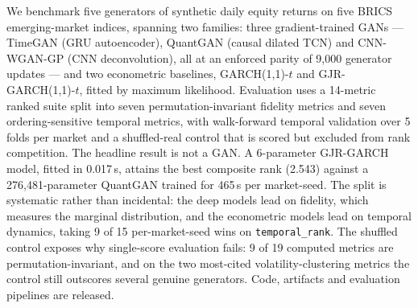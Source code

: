 \documentclass[10pt]{article}
\begin{document}
\begin{tcolorbox}[enhanced,arc=4pt,boxrule=1pt,colframe=Navy,colback=LBg,
  top=6pt,bottom=6pt,left=8pt,right=8pt,before skip=2pt,after skip=8pt,
  title={\bfseries Abstract}]
\small
We benchmark five generators of synthetic daily equity returns on five BRICS emerging-market indices, spanning two families: three gradient-trained GANs --- TimeGAN (GRU autoencoder), QuantGAN (causal dilated TCN) and CNN-WGAN-GP (CNN deconvolution), all at an enforced parity of 9,000 generator updates --- and two econometric baselines, GARCH(1,1)-$t$ and GJR-GARCH(1,1)-$t$, fitted by maximum likelihood. Evaluation uses a 14-metric ranked suite split into seven permutation-invariant fidelity metrics and seven ordering-sensitive temporal metrics, with walk-forward temporal validation over 5 folds per market and a shuffled-real control that is scored but excluded from rank competition. The headline result is not a GAN. A 6-parameter GJR-GARCH model, fitted in 0.017\,s, attains the best composite rank (2.543) against a 276,481-parameter QuantGAN trained for 465\,s per market-seed. The split is systematic rather than incidental: the deep models lead on fidelity, which measures the marginal distribution, and the econometric models lead on temporal dynamics, taking 9 of 15 per-market-seed wins on \texttt{temporal\_rank}. The shuffled control exposes why single-score evaluation fails: 9 of 19 computed metrics are permutation-invariant, and on the two most-cited volatility-clustering metrics the control still outscores several genuine generators. Code, artifacts and evaluation pipelines are released.
\end{tcolorbox}
\end{document}
